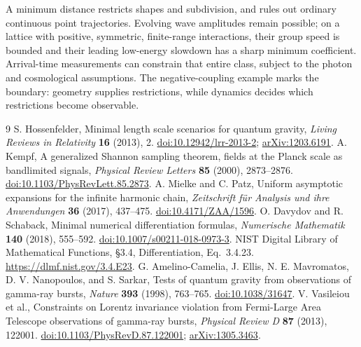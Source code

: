 \documentclass[11pt]{article}
\begin{document}
A minimum distance restricts shapes and subdivision, and rules out ordinary continuous point trajectories. Evolving wave amplitudes remain possible; on a lattice with positive, symmetric, finite-range interactions, their group speed is bounded and their leading low-energy slowdown has a sharp minimum coefficient. Arrival-time measurements can constrain that entire class, subject to the photon and cosmological assumptions. The negative-coupling example marks the boundary: geometry supplies restrictions, while dynamics decides which restrictions become observable.

\begin{thebibliography}{9}
\small
\setlength{\itemsep}{2pt}
\setlength{\parskip}{0pt}
 S. Hossenfelder, Minimal length scale scenarios for quantum gravity, \emph{Living Reviews in Relativity} \textbf{16} (2013), 2. \href{https://doi.org/10.12942/lrr-2013-2}{doi:10.12942/lrr-2013-2}; \href{https://arxiv.org/abs/1203.6191}{arXiv:1203.6191}.
 A. Kempf, A generalized Shannon sampling theorem, fields at the Planck scale as bandlimited signals, \emph{Physical Review Letters} \textbf{85} (2000), 2873--2876. \href{https://doi.org/10.1103/PhysRevLett.85.2873}{doi:10.1103/PhysRevLett.85.2873}.
 A. Mielke and C. Patz, Uniform asymptotic expansions for the infinite harmonic chain, \emph{Zeitschrift f\"ur Analysis und ihre Anwendungen} \textbf{36} (2017), 437--475. \href{https://doi.org/10.4171/ZAA/1596}{doi:10.4171/ZAA/1596}.
 O. Davydov and R. Schaback, Minimal numerical differentiation formulas, \emph{Numerische Mathematik} \textbf{140} (2018), 555--592. \href{https://doi.org/10.1007/s00211-018-0973-3}{doi:10.1007/s00211-018-0973-3}.
 NIST Digital Library of Mathematical Functions, \S3.4, Differentiation, Eq.~3.4.23. \url{https://dlmf.nist.gov/3.4.E23}.
 G. Amelino-Camelia, J. Ellis, N. E. Mavromatos, D. V. Nanopoulos, and S. Sarkar, Tests of quantum gravity from observations of gamma-ray bursts, \emph{Nature} \textbf{393} (1998), 763--765. \href{https://doi.org/10.1038/31647}{doi:10.1038/31647}.
 V. Vasileiou et al., Constraints on Lorentz invariance violation from Fermi-Large Area Telescope observations of gamma-ray bursts, \emph{Physical Review D} \textbf{87} (2013), 122001. \href{https://doi.org/10.1103/PhysRevD.87.122001}{doi:10.1103/PhysRevD.87.122001}; \href{https://arxiv.org/abs/1305.3463}{arXiv:1305.3463}.
\end{thebibliography}
\end{document}
